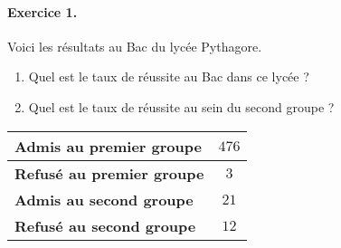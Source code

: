 \documentclass[11pt]{article}
\begin{document}
\vspace{2cm}

\paragraph{Exercice 1.} Voici les résultats au Bac du lycée Pythagore.\\
\begin{minipage}{.5\textwidth}
  \begin{enumerate}
    \item Quel est le taux de réussite au Bac dans ce lycée ?
    \item Quel est le taux de réussite au sein du second groupe ?
  \end{enumerate}
\end{minipage}
\begin{minipage}{.5\textwidth}
  \begin{center}
\renewcommand{\arraystretch}{1.5}
  \begin{tabular}[]{|l|c|}
    \hline
    \textbf{Admis au premier groupe} & $476$ \\
    \hline
    \textbf{Refusé au premier groupe} & $3$ \\
    \hline
    \textbf{Admis au second groupe} & $21$ \\
    \hline
    \textbf{Refusé au second groupe} & $12$ \\
    \hline
  \end{tabular}
  \end{center}
\end{minipage}
\end{document}
